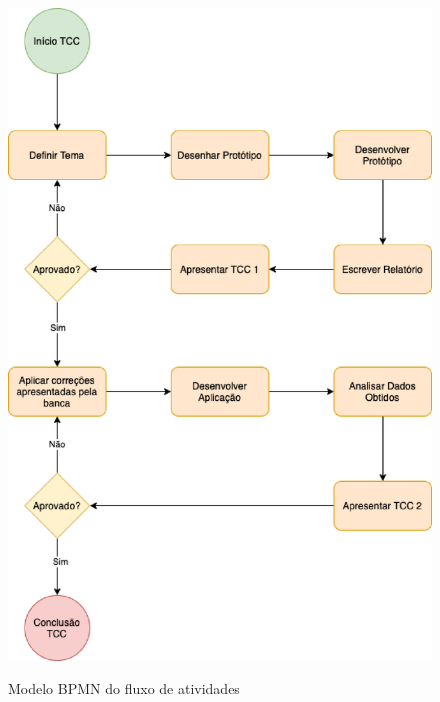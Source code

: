     \begin{figure}[!h]
    	\centering
    	\caption{Modelo BPMN do fluxo de atividades}
    	\includegraphics[keepaspectratio=true,scale=0.4]{figuras/metodologia.eps}
    	\label{fig09}
    \end{figure}
    
